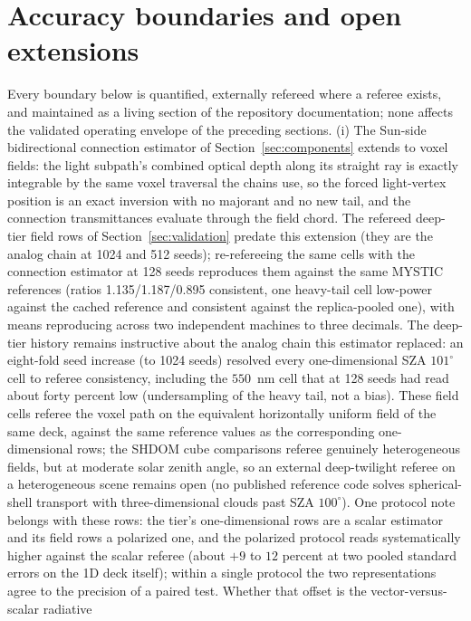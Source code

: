 \documentclass[preprint,12pt]{elsarticle}
\begin{document}
\section{Accuracy boundaries and open extensions}
\label{sec:limits}

Every boundary below is quantified, externally refereed where a
referee exists, and maintained as a living section of the repository
documentation; none affects the validated operating envelope of the
preceding sections. (i) The Sun-side bidirectional connection
estimator of Section~\ref{sec:components} extends to voxel fields:
the light subpath's combined optical depth along its straight ray is
exactly integrable by the same voxel traversal the chains use, so the
forced light-vertex position is an exact inversion with no majorant
and no new tail, and the connection transmittances evaluate through
the field chord. The refereed deep-tier field rows of
Section~\ref{sec:validation} predate this extension (they are the
analog chain at 1024 and 512 seeds); re-refereeing the same cells with
the connection estimator at 128 seeds reproduces them against the same
MYSTIC references (ratios 1.135/1.187/0.895 consistent, one heavy-tail
cell low-power against the cached reference and consistent against the
replica-pooled one), with means reproducing across two independent
machines to three decimals. The deep-tier history remains instructive
about the analog chain this estimator replaced: an eight-fold seed
increase (to 1024 seeds) resolved every one-dimensional SZA
$101^\circ$ cell to referee consistency, including the $550$~nm cell
that at 128 seeds had read about forty percent low (undersampling of
the heavy tail, not a bias). These field cells referee the voxel path
on the equivalent horizontally uniform field of the same deck, against
the same reference values as the corresponding one-dimensional rows;
the SHDOM cube comparisons referee genuinely heterogeneous fields, but
at moderate solar zenith angle, so an external deep-twilight referee
on a heterogeneous scene remains open (no published reference code
solves spherical-shell transport with three-dimensional clouds past
SZA $100^{\circ}$). One protocol note belongs with these rows: the
tier's one-dimensional rows are a scalar estimator and its field rows
a polarized one, and the polarized protocol reads systematically
higher against the scalar referee (about $+9$ to $12$ percent at two
pooled standard errors on the 1D deck itself); within a single
protocol the two representations agree to the precision of a paired
test. Whether that offset is the vector-versus-scalar radiative
\end{document}
